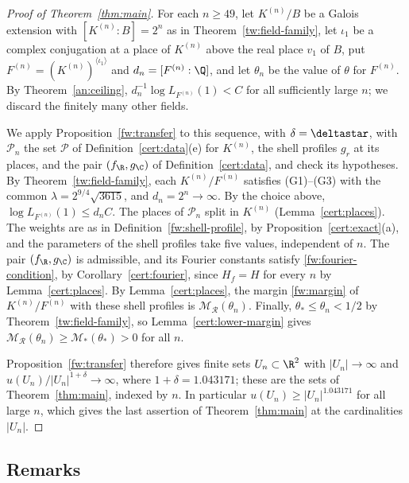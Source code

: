 \begin{proof}[Proof of Theorem~\ref{thm:main}]
For each $n\ge49$, let $K^{(n)}/B$ be a Galois extension with
$[K^{(n)}:B]=2^n$ as in Theorem~\ref{tw:field-family}, let $\iota_1$ be
a complex conjugation at a place of $K^{(n)}$ above the real place $v_1$
of $B$, put $F^{(n)}=(K^{(n)})^{\langle\iota_1\rangle}$ and
$d_n=[F^{(n)}:\Q]$, and let $\theta_n$ be the value of $\theta$ for
$F^{(n)}$. By Theorem~\ref{an:ceiling}, $d_n^{-1}\log L_{F^{(n)}}(1)<C$
for all sufficiently large $n$; we discard the finitely many other
fields.

We apply Proposition~\ref{fw:transfer} to this sequence, with
$\delta=\deltastar$, with $\mathcal P_n$ the set $\mathcal P$ of
Definition~\ref{cert:data}(e) for $K^{(n)}$, the shell profiles $g_r$ at its
places, and the pair $(f_\R,g_\C)$ of Definition~\ref{cert:data}, and check
its hypotheses. By Theorem~\ref{tw:field-family}, each $K^{(n)}/F^{(n)}$
satisfies (G1)--(G3) with the common $\lambda=2^{9/4}\sqrt{3615}$, and
$d_n=2^n\to\infty$. By the choice above, $\log L_{F^{(n)}}(1)\le d_nC$. The
places of $\mathcal P_n$ split in $K^{(n)}$ (Lemma~\ref{cert:places}). The
weights are as in Definition~\ref{fw:shell-profile}, by
Proposition~\ref{cert:exact}(a), and the parameters of the shell profiles take
five values, independent of $n$. The pair $(f_\R,g_\C)$ is admissible, and its
Fourier constants satisfy \eqref{fw:fourier-condition}, by
Corollary~\ref{cert:fourier}, since $H_f=H$ for every $n$ by
Lemma~\ref{cert:places}. By Lemma~\ref{cert:places}, the margin
\eqref{fw:margin} of $K^{(n)}/F^{(n)}$ with these shell profiles is
$\mathcal M_{\mathcal R}(\theta_n)$. Finally, $\theta_*\le\theta_n<1/2$ by
Theorem~\ref{tw:field-family}, so Lemma~\ref{cert:lower-margin} gives
$\mathcal M_{\mathcal R}(\theta_n)\ge\mathcal M_*(\theta_*)>0$ for all $n$.

Proposition~\ref{fw:transfer} therefore gives finite sets
$U_n\subset\R^2$ with $|U_n|\to\infty$ and
$u(U_n)/|U_n|^{1+\delta}\to\infty$, where $1+\delta=1.043171$; these are
the sets of Theorem~\ref{thm:main}, indexed by $n$. In particular
$u(U_n)\ge|U_n|^{1.043171}$ for all large $n$, which gives the last
assertion of Theorem~\ref{thm:main} at the cardinalities $|U_n|$.
\end{proof}

\subsection{Remarks}

